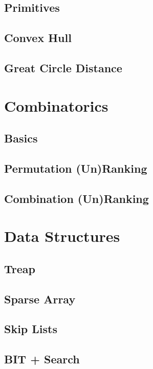 		\subsection{Primitives}
			
		\subsection{Convex Hull}
			
		\subsection{Great Circle Distance}
			
	\section{Combinatorics}
		\subsection{Basics}
			
		\subsection{Permutation (Un)Ranking}
			
		\subsection{Combination (Un)Ranking}
			
	\section{Data Structures}
		\subsection{Treap}
			
		\subsection{Sparse Array}
			
		\subsection{Skip Lists}
			
		\subsection{BIT + Search}
			
